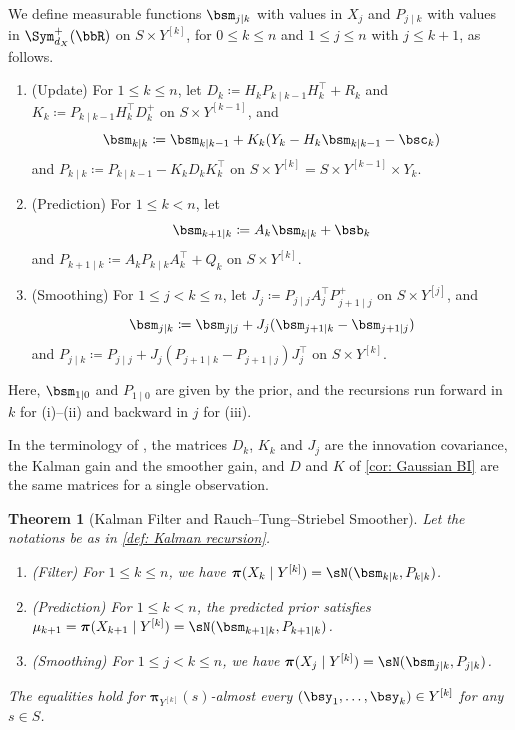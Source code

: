 \documentclass[12pt,reqno]{amsart}%
\theoremstyle{plain}
\newtheorem{theorem}{Theorem}[section]
\theoremstyle{definition}
\def\bspi{\boldsymbol{\pi}}
\def\R{\bbR}
\begin{document}
\begin{definition}\label{def: Kalman recursion}
	We define measurable functions $\bsm_{j\mid k}$ with values in $X_j$ and $P_{j\mid k}$ with values in
	$\Sym^+_{d_X}(\R)$ on $S\times Y^{[k]}$, for $0\leq k\leq n$ and $1\leq j\leq n$ with $j\leq k+1$, as follows.
	\begin{enumerate}[label=(\roman*)]
		\item (Update) For $1\leq k\leq n$, let
		$
			D_k\coloneqq H_kP_{k\mid k-1}H_k^{\top}+R_k
		$
		and
		$
			K_k\coloneqq P_{k\mid k-1}H_k^{\top}D_k^+
		$
		on $S\times Y^{[k-1]}$, and
		\[
			\bsm_{k\mid k}\coloneqq \bsm_{k\mid k-1}+K_k(Y_k-H_k\bsm_{k\mid k-1}-\bsc_k)
		\]
		and
		$
			P_{k\mid k}\coloneqq P_{k\mid k-1}-K_kD_kK_k^{\top}
		$
		on $S\times Y^{[k]}=S\times Y^{[k-1]}\times Y_k$.
		\item (Prediction) For $1\leq k<n$, let
		\[
			\bsm_{k+1\mid k}\coloneqq A_k\bsm_{k\mid k}+\bsb_k
		\]
		and
		$
			P_{k+1\mid k}\coloneqq A_kP_{k\mid k}A_k^{\top}+Q_k
		$
		on $S\times Y^{[k]}$.
		\item (Smoothing) For $1\leq j<k\leq n$, let
		$
			J_j\coloneqq P_{j\mid j}A_j^{\top}P_{j+1\mid j}^+
		$
		on $S\times Y^{[j]}$, and
		\[
			\bsm_{j\mid k}\coloneqq \bsm_{j\mid j}+J_j(\bsm_{j+1\mid k}-\bsm_{j+1\mid j})
		\]
		and
		$
			P_{j\mid k}\coloneqq P_{j\mid j}+J_j(P_{j+1\mid k}-P_{j+1\mid j})J_j^{\top}
		$
		on $S\times Y^{[k]}$.
	\end{enumerate}
	Here, $\bsm_{1\mid0}$ and $P_{1\mid0}$ are given by the prior, and the recursions run forward in $k$
	for (i)--(ii) and backward in $j$ for (iii).
\end{definition}

In the terminology of \cite{SS23}, the matrices $D_k$, $K_k$ and $J_j$ are the innovation covariance,
the Kalman gain and the smoother gain, and $D$ and $K$ of \cref{cor: Gaussian BI} are the same matrices for a single observation.

\begin{theorem}[Kalman Filter and Rauch--Tung--Striebel Smoother]\label{thm: Kalman}
	Let the notations be as in \cref{def: Kalman recursion}.
	\begin{enumerate}[label=(\roman*)]
		\item\label{Kalman: filter} (Filter) For $1\leq k\leq n$, we have
		$\bspi(X_k\mid Y^{[k]})=\sN(\bsm_{k\mid k},P_{k\mid k})$.
		\item\label{Kalman: predict} (Prediction) For $1\leq k<n$, the predicted prior satisfies
		$\mu_{k+1}=\bspi(X_{k+1}\mid Y^{[k]})=\sN(\bsm_{k+1\mid k},P_{k+1\mid k})$.
		\item\label{Kalman: smooth} (Smoothing) For $1\leq j<k\leq n$, we have
		$\bspi(X_j\mid Y^{[k]})=\sN(\bsm_{j\mid k},P_{j\mid k})$.
	\end{enumerate}
	The equalities hold for $\bspi_{Y^{[k]}}(s)$-almost every $(\bsy_1,\ldots,\bsy_k)\in Y^{[k]}$ for any $s\in S$.
\end{theorem}
\end{document}
